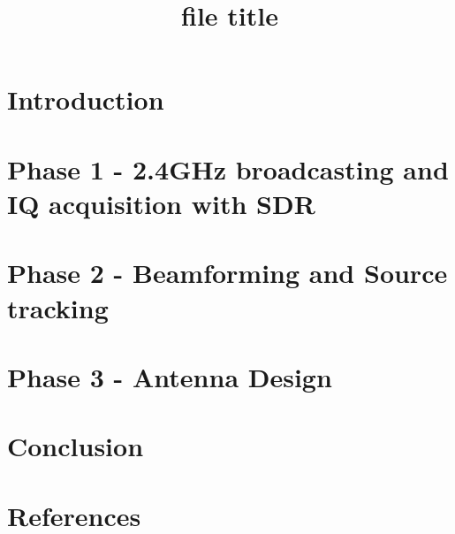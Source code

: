 \documentclass{rapport}
\title{file title} %
\begin{document}


\subject{ } %


        
\buildmargins %
\buildcover %
\renewcommand{\contentsname}{Table of Contents}
\toc %

\section{Introduction}

\clearpage


\section{Phase 1 - 2.4GHz broadcasting and IQ acquisition with SDR}



\section{Phase 2 - Beamforming and Source tracking}



\section{Phase 3 - Antenna Design}



\section{Conclusion}



\section{References}

\end{document}
